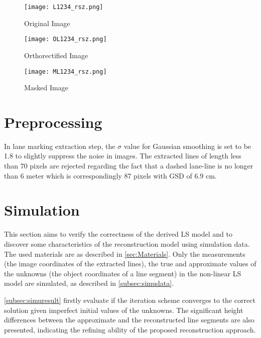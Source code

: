 \begin{figure}%
  \parbox{.475\linewidth}{
    \centering
    \texttt{[image: L1234\_rsz.png]}
    \caption{\small Original Image}
    \label{fig:OriImg}
  }
  \quad
  \parbox{.475\linewidth}{
    \centering
    \texttt{[image: OL1234\_rsz.png]}
    \caption{\small Orthorectified Image}
    \label{fig:OrthoImg}
  }
  \centering
  \parbox{.7\linewidth}{
    \texttt{[image: ML1234\_rsz.png]}
    \caption{\small Masked Image}
    \label{fig:MaskedImg}
  }
\end{figure}

\clearpage
\section{Preprocessing}
\label{sec:preprocessing}

In lane marking extraction step, the $\sigma$ value for Gaussian smoothing is set to be 1.8 %
to slightly suppress the noise in images.
The extracted lines of length less than 70 pixels are rejected %
regarding the fact that a dashed lane-line is no longer than 6 meter which is correspondingly 87 pixels with GSD of 6.9 cm.


\section{Simulation}
\label{sec:simulation}
This section aims to verify the correctness of the derived LS model and to discover some characteristics of the reconstruction model using simulation data. The used materials are as described in \cref{sec:Materials}. Only the measurements (the image coordinates of the extracted lines), the true and approximate values of the unknowns (the object coordinates of a line segment) in the non-linear LS model are simulated, as described in \cref{subsec:simudata}.

\cref{subsec:simuresult} firstly evaluate if the iteration scheme converges to the correct solution given imperfect initial values of the unknowns. The significant height differences between the approximate and the reconstructed line segments are also presented, indicating the refining ability of the proposed reconstruction approach.

